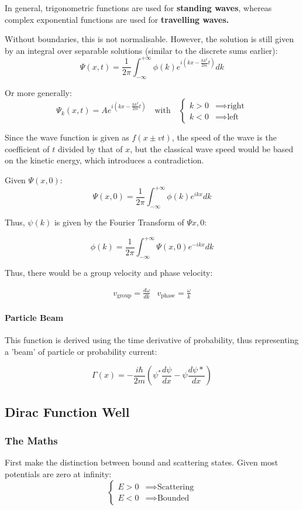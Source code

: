 \documentclass[12pt]{article}
\begin{document}
In general, trigonometric functions are used for \textbf{standing waves}, whereas complex exponential functions are used for \textbf{travelling waves.}

Without boundaries, this is not normalisable. However, the solution is still given by an integral over separable solutions (similar to the discrete sums earlier):
\[\boxed{\Psi(x,t) = \frac{1}{2\pi}\int^{+\infty}_{-\infty}\phi(k)e^{i(kx-\frac{\hbar k^2}{2m}t)}dk}\]

Or more generally:
\[ \Psi_k(x,t) = Ae^{i(kx-\frac{\hbar k^2}{2m}t)} \quad \text{with} \quad 
\left.
\begin{cases}
     k > 0 &\implies \text{right}\\
    k < 0 &\implies \text{left} 
\end{cases}
\right.
\]


Since the wave function is given as $f(x\pm vt)$, the speed of the wave is the coefficient of $t$ divided by that of $x$, but the classical wave speed would be based on the kinetic energy, which introduces a contradiction.


Given $\Psi(x,0)$:
\[ \Psi(x,0) = \frac{1}{2\pi}\int^{+\infty}_{-\infty}\phi(k)e^{ikx}dk\]

Thus, $\psi(k)$ is given by the Fourier Transform of $\Psi{x,0}$:

\[\phi(k) = \frac{1}{2\pi}\int^{+\infty}_{-\infty}\Psi(x,0)e^{-ikx}dk\]

Thus, there would be a group velocity and phase velocity: 

\[
\begin{matrix}
v_{\text{group}} = \frac{d\omega}{dk} & v_{\text{phase}} = \frac{\omega}{k}
\end{matrix}
\]

\paragraph{Particle Beam}
This function is derived using the time derivative of probability, thus representing a 'beam' of particle or probability current:

\[\Gamma(x) = -\frac{i\hbar}{2m}(\psi^*\frac{d\psi}{dx} - \psi \frac{d\psi*}{dx})\]

\subsection{Dirac Function Well}

\subsubsection{The Maths}
First make the distinction between bound and scattering states. Given most potentials are zero at infinity: 
\[
\left.
\begin{cases}
E > 0 &\implies \text{Scattering}\\
E < 0 &\implies \text{Bounded}
\end{cases}
\right.
\]
\end{document}
